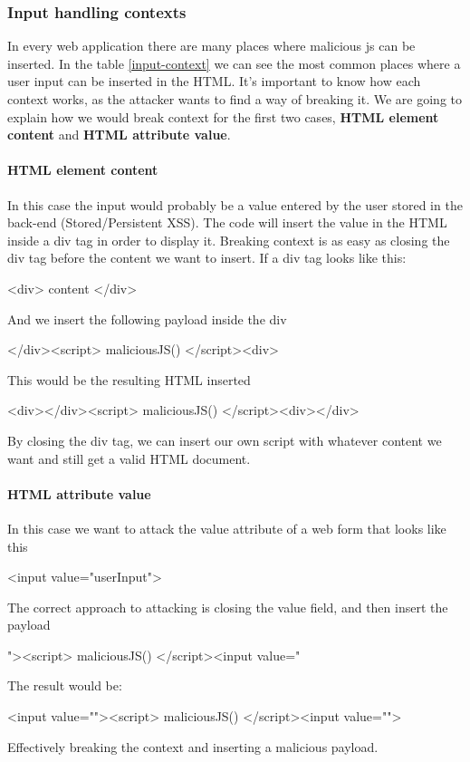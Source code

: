 \subsubsection{Input handling contexts}
In every web application there are many places where malicious js can be inserted. In the table \ref{input-context} we can see the most common places where a user input can be inserted in the HTML. It's important to know how each context works, as the attacker wants to find a way of breaking it. We are going to explain how we would break context for the first two cases, \textbf{HTML element content} and \textbf{HTML attribute value}.

\paragraph{HTML element content}
In this case the input would probably be a value entered by the user stored in the back-end (Stored/Persistent XSS). The code will insert the value in the HTML inside a div tag in order to display it. Breaking context is as easy as closing the div tag before the content we want to insert. If a div tag looks like this:
\begin{html}
  <div> content </div>
\end{html}
And we insert the following payload inside the div
\begin{html}
</div><script> maliciousJS() </script><div> 
\end{html}
This would be the resulting HTML inserted
\begin{html}
<div></div><script> maliciousJS() </script><div></div>
\end{html}
By closing the div tag, we can insert our own script with whatever content we want and still get a valid HTML document.

\paragraph{HTML attribute value}
In this case we want to attack the value attribute of a web form that looks like this
\begin{html}<input value="userInput">\end{html}
The correct approach to attacking is closing the value field, and then insert the payload
\begin{html}"><script> maliciousJS() </script><input value="\end{html}
The result would be:
\begin{html}
  <input value=""><script> maliciousJS() </script><input value="">
\end{html}
Effectively breaking the context and inserting a malicious payload.


